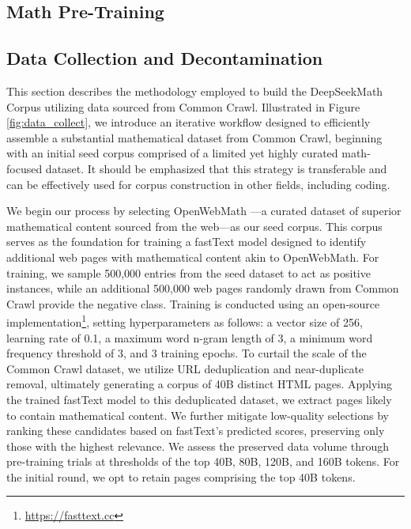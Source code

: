 \begin{itemize}[topsep=0pt]
\section{Math Pre-Training}

\subsection{Data Collection and Decontamination} This section describes the methodology employed to build the DeepSeekMath Corpus utilizing data sourced from Common Crawl. Illustrated in Figure \ref{fig:data_collect}, we introduce an iterative workflow designed to efficiently assemble a substantial mathematical dataset from Common Crawl, beginning with an initial seed corpus comprised of a limited yet highly curated math-focused dataset. It should be emphasized that this strategy is transferable and can be effectively used for corpus construction in other fields, including coding.

We begin our process by selecting OpenWebMath \citep{openwebmath}—a curated dataset of superior mathematical content sourced from the web—as our seed corpus. This corpus serves as the foundation for training a fastText model \citep{joulin2016fasttext} designed to identify additional web pages with mathematical content akin to OpenWebMath. For training, we sample 500,000 entries from the seed dataset to act as positive instances, while an additional 500,000 web pages randomly drawn from Common Crawl provide the negative class. Training is conducted using an open-source implementation\footnote{\url{https://fasttext.cc}}, setting hyperparameters as follows: a vector size of 256, learning rate of 0.1, a maximum word n-gram length of 3, a minimum word frequency threshold of 3, and 3 training epochs. To curtail the scale of the Common Crawl dataset, we utilize URL deduplication and near-duplicate removal, ultimately generating a corpus of 40B distinct HTML pages. Applying the trained fastText model to this deduplicated dataset, we extract pages likely to contain mathematical content. We further mitigate low-quality selections by ranking these candidates based on fastText’s predicted scores, preserving only those with the highest relevance. We assess the preserved data volume through pre-training trials at thresholds of the top 40B, 80B, 120B, and 160B tokens. For the initial round, we opt to retain pages comprising the top 40B tokens.


\end{itemize}
